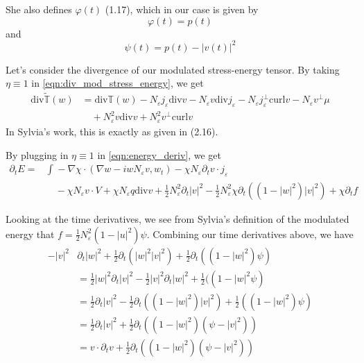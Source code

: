 \documentclass[a4paper]{article}
\newcommand{\curl}{\mathrm{curl}}
\renewcommand{\div}{\mathrm{div}}
\begin{document}
She also defines $\varphi(t)$ (1.17), which in our case is given by
\begin{equation}
  \varphi(t) = p(t)
  \label{eqn:phi}
\end{equation}
and
\begin{equation}
  \psi(t) = p(t) - |v(t)|^2
  \label{eqn:psi}
\end{equation}

Let's consider the divergence of our modulated stress-energy tensor. By taking $\eta \equiv 1$ in \eqref{eqn:div_mod_stress_energy}, we get
\begin{align}
  \div \tilde{\mathbb{T}} (w) &= \div \mathbb{T} (w) - N_\varepsilon j_\varepsilon \div v - N_\varepsilon v \div j_\varepsilon - N_\varepsilon
  j_\varepsilon^\perp \curl v - N_\varepsilon v^\perp \mu \nonumber \\
  &\quad + N_\varepsilon^2 v \div v + N_\varepsilon^2 v^\perp \curl v
  \label{eqn:comparison_div_stress_energy}
\end{align}
In Sylvia's work, this is exactly as given in (2.16).

By plugging in $\eta \equiv 1$ in \eqref{eqn:energy_deriv}, we get
\begin{align}
  \partial_t E = &\int_{}^{} - \nabla \chi \cdot ( \nabla w - i w N_\varepsilon v, w_t ) - \chi N_\varepsilon \partial_t v \cdot j_\varepsilon \nonumber
  \\
  &\quad - \chi N_\varepsilon v \cdot V + \chi N_\varepsilon q \div v + \frac{1}{2} N_\varepsilon^2 \partial_t |v|^2 - \frac{1}{2} N_\varepsilon^2 \chi
  \partial_t ( (1 - |w|^2)|v|^2 ) + \chi \partial_t f
  \label{eqn:comparison_energy_deriv1}
\end{align}

Looking at the time derivatives, we see from Sylvia's definition of the modulated energy that $f = \frac{1}{2} N_\varepsilon^2 ( 1 - |u|^2 ) \psi$.
Combining our time derivatives above, we have
\begin{align}
  - |v|^2 &\partial_t |w|^2 + \frac{1}{2}\partial_t ( |w|^2 |v|^2 ) + \frac{1}{2} \partial_t ( (1-|w|^2) \psi ) \nonumber \\
  &= \frac{1}{2} |w|^2 \partial_t |v|^2 - \frac{1}{2} |v|^2 \partial_t |w|^2 + \frac{1}{2} ( (1-|w|^2 \psi) \nonumber \\
  &= \frac{1}{2} \partial_t |v|^2 - \frac{1}{2} \partial_t ( (1-|w|^2)|v|^2) + \frac{1}{2} ( (1-|w|^2) \psi ) \nonumber \\
  &= \frac{1}{2} \partial_t |v|^2 + \frac{1}{2} \partial_t ( ( 1-|w|^2 ) ( \psi - |v|^2 ) ) \nonumber \\
  &= v \cdot \partial_t v + \frac{1}{2} \partial_t ( (1-|w|^2) ( \psi - |v|^2 ) )
  \label{eqn:comparison_time_derivs}
\end{align}
\end{document}
